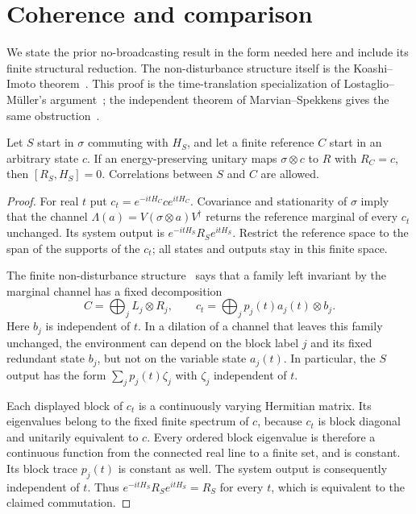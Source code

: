 \section{Coherence and comparison}\label{app:coherence}
We state the prior no-broadcasting result in the form needed here and include its finite structural reduction. The non-disturbance structure itself is the Koashi--Imoto theorem~\cite{koashi}. This proof is the time-translation specialization of Lostaglio--M\"uller's argument~\cite{lostaglio}; the independent theorem of Marvian--Spekkens gives the same obstruction~\cite{marvian}.

\begin{lemma}\label{lem:nobroadcast}
Let $S$ start in $\sigma$ commuting with $H_S$, and let a finite reference $C$ start in an arbitrary state $c$. If an energy-preserving unitary maps $\sigma\otimes c$ to $R$ with $R_C=c$, then $[R_S,H_S]=0$. Correlations between $S$ and $C$ are allowed.
\end{lemma}
\begin{proof}
For real $t$ put $c_t=e^{-itH_C}ce^{itH_C}$. Covariance and stationarity of $\sigma$ imply that the channel $\Lambda(a)=V(\sigma\otimes a)V^\dagger$ returns the reference marginal of every $c_t$ unchanged. Its system output is $e^{-itH_S}R_Se^{itH_S}$. Restrict the reference space to the span of the supports of the $c_t$; all states and outputs stay in this finite space.

The finite non-disturbance structure~\cite{koashi} says that a family left invariant by the marginal channel has a fixed decomposition
\[
 C=\bigoplus_j L_j\otimes R_j,\qquad
 c_t=\bigoplus_j p_j(t)a_j(t)\otimes b_j.
\]
Here $b_j$ is independent of $t$. In a dilation of a channel that leaves this family unchanged, the environment can depend on the block label $j$ and its fixed redundant state $b_j$, but not on the variable state $a_j(t)$. In particular, the $S$ output has the form $\sum_j p_j(t)\zeta_j$ with $\zeta_j$ independent of $t$.

Each displayed block of $c_t$ is a continuously varying Hermitian matrix. Its eigenvalues belong to the fixed finite spectrum of $c$, because $c_t$ is block diagonal and unitarily equivalent to $c$. Every ordered block eigenvalue is therefore a continuous function from the connected real line to a finite set, and is constant. Its block trace $p_j(t)$ is constant as well. The system output is consequently independent of $t$. Thus $e^{-itH_S}R_Se^{itH_S}=R_S$ for every $t$, which is equivalent to the claimed commutation.
\end{proof}

